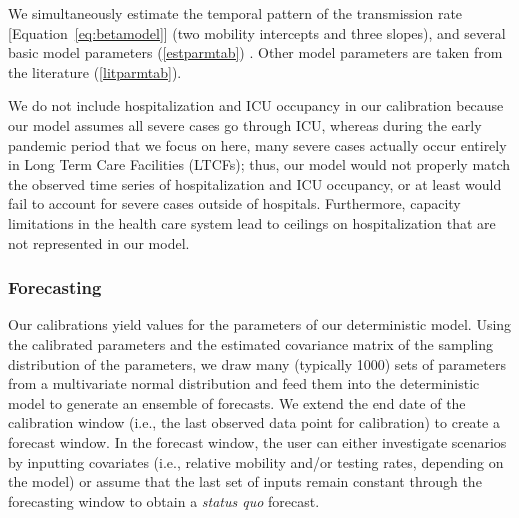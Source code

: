 \documentclass[12pt]{article}\usepackage[]{graphicx}\usepackage[]{color}
\begin{document}
We simultaneously estimate the temporal pattern of the transmission rate [Equation~\eqref{eq:betamodel}] (two mobility intercepts and three slopes), and several basic model parameters (\cref{estparmtab}) .
Other model parameters are taken from the literature (\cref{litparmtab}).

We do not include hospitalization and ICU occupancy in our calibration because our model assumes all severe cases go through ICU, whereas during the early pandemic period
that we focus on here, many severe cases actually occur entirely in Long Term Care Facilities (LTCFs); thus,
our model would not properly match the observed time series of hospitalization and ICU occupancy, or at least would fail to account for
severe cases outside of hospitals. Furthermore, capacity limitations in the health care system lead to ceilings on hospitalization that are
not represented in our model.

\subsubsection*{Forecasting}

Our calibrations yield values for the parameters of our deterministic model. 
Using the calibrated parameters and the estimated covariance matrix of the sampling distribution of the parameters, we draw many (typically 1000) sets of parameters from a multivariate normal distribution \cite{Bolk08,krinskyThree1991a} and feed them into the deterministic model to generate an ensemble of forecasts. We extend the end date of the calibration window (i.e., the last observed data point for calibration) to create a forecast window. In the forecast window, the user can either investigate scenarios by inputting covariates (i.e., relative mobility and/or testing rates, depending on the model) or assume that the last set of inputs remain constant through the forecasting window to obtain a
\emph{status quo} forecast.
\end{document}
